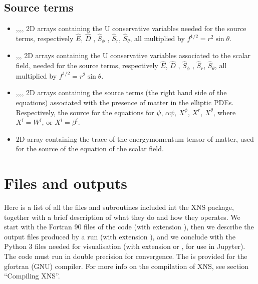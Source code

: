 \documentclass[letterpaper,10pt,english]{sphinxmanual}
\begin{document}
\section{Source terms}
\label{\detokenize{arrays:source-terms}}\begin{itemize}
\item {} 
\sphinxAtStartPar
{},,,, \sphinxhyphen{} 2D arrays containing the U conservative variables needed for
the source terms, respectively \(\hat E\), \(\hat D\) , \(\hat S _\phi\) , \(\hat S _r\), \(\hat S _\theta\), all multiplied by \(f ^{1/2} = r^2 \sin \theta\).


\item {} 
\sphinxAtStartPar
{},,, \sphinxhyphen{} 2D arrays containing the U conservative variables associated to the scalar field, needed for the source terms, respectively \(\hat E\), \(\hat D\) , \(\hat S _\phi\) , \(\hat S _r\), \(\hat S _\theta\), all multiplied by \(f ^{1/2} = r^2 \sin \theta\).


\item {} 
\sphinxAtStartPar
{},,,, \sphinxhyphen{} 2D arrays containing the source terms (the right hand side of
the equations) associated with the presence of matter in the elliptic PDEs. Respectively, the source
for the equations for \(\psi\), \(\alpha \psi\), \(X^{\phi}\), \(X^{r}\), \(X^{\theta}\), where \(X^i=W^i\), or \(X^i = \beta ^i\).


\item {} 
\sphinxAtStartPar
{} \sphinxhyphen{} 2D array containing the trace of the energy\sphinxhyphen{}momentum tensor of matter, used for the source of the equation of the scalar field.

\end{itemize}


\chapter{Files and outputs}
\label{\detokenize{files_outputs:files-and-outputs}}\label{\detokenize{files_outputs::doc}}
\sphinxAtStartPar
Here is a list of all the files and subroutines included int the XNS package, together with a brief
description of what they do and how they operates. We start with the Fortran 90 files of the code (with
extension ), then we describe the output files produced by a run (with extension ), and we conclude
with the Python 3 files needed for visualisation (with extension  or , for use in Jupyter). The code
must run in double precision for convergence. The  is provided for the gfortran (GNU) compiler. For more
info on the compilation of XNS, see section “Compiling XNS”.
\end{document}
